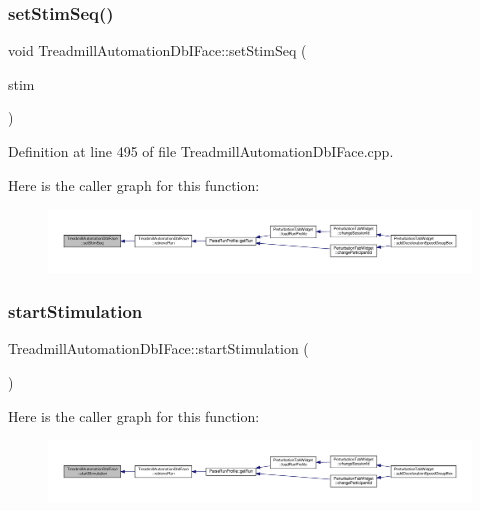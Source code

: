 \subsubsection{\texorpdfstring{set\+Stim\+Seq()}{setStimSeq()}}
{\footnotesize\ttfamily void Treadmill\+Automation\+Db\+I\+Face\+::set\+Stim\+Seq (\begin{DoxyParamCaption}\item[{Q\+String}]{stim }\end{DoxyParamCaption})}



Definition at line 495 of file Treadmill\+Automation\+Db\+I\+Face.\+cpp.

Here is the caller graph for this function\+:
\nopagebreak
\begin{figure}[H]
\begin{center}
\leavevmode
\includegraphics[width=350pt]{class_treadmill_automation_db_i_face_a3a90027f63e3291ea36f4cc9c79dd896_icgraph}
\end{center}
\end{figure}
\mbox{\label{class_treadmill_automation_db_i_face_ac0f0625e2e78c69900ea4a4719b52f65}} 
\subsubsection{\texorpdfstring{start\+Stimulation}{startStimulation}}
{\footnotesize\ttfamily Treadmill\+Automation\+Db\+I\+Face\+::start\+Stimulation (\begin{DoxyParamCaption}{ }\end{DoxyParamCaption})\hspace{0.3cm}{\ttfamily [signal]}}

Here is the caller graph for this function\+:
\nopagebreak
\begin{figure}[H]
\begin{center}
\leavevmode
\includegraphics[width=350pt]{class_treadmill_automation_db_i_face_ac0f0625e2e78c69900ea4a4719b52f65_icgraph}
\end{center}
\end{figure}
\mbox{\label{class_treadmill_automation_db_i_face_a806259743506350c3152586229e741bd}} 
